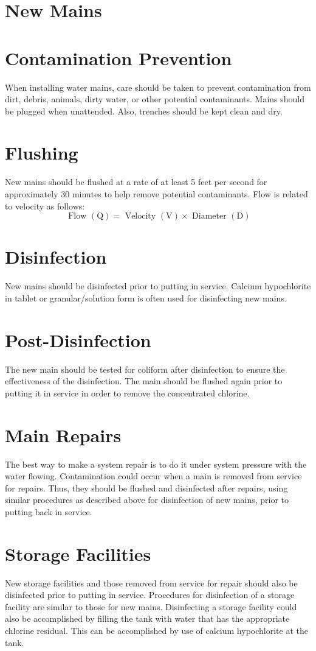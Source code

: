 \documentclass[10pt]{article}
\begin{document}
\section{New Mains}
\section{Contamination Prevention}
When installing water mains, care should be taken to prevent contamination from dirt, debris, animals, dirty water, or other potential contaminants. Mains should be plugged when unattended. Also, trenches should be kept clean and dry.

\section{Flushing}
New mains should be flushed at a rate of at least 5 feet per second for approximately 30 minutes to help remove potential contaminants. Flow is related to velocity as follows:
$$
\text { Flow }(\mathrm{Q})=\text { Velocity }(\mathrm{V}) \times \text { Diameter }(\mathrm{D})
$$

\section{Disinfection}
New mains should be disinfected prior to putting in service. Calcium hypochlorite in tablet or granular/solution form is often used for disinfecting new mains.

\section{Post-Disinfection}
The new main should be tested for coliform after disinfection to ensure the effectiveness of the disinfection. The main should be flushed again prior to putting it in service in order to remove the concentrated chlorine.

\section{Main Repairs}
The best way to make a system repair is to do it under system pressure with the water flowing. Contamination could occur when a main is removed from service for repairs. Thus, they should be flushed and disinfected after repairs, using similar procedures as described above for disinfection of new mains, prior to putting back in service.

\section{Storage Facilities}
New storage facilities and those removed from service for repair should also be disinfected prior to putting in service. Procedures for disinfection of a storage facility are similar to those for new mains. Disinfecting a storage facility could also be accomplished by filling the tank with water that has the appropriate chlorine residual. This can be accomplished by use of calcium hypochlorite at the tank.
\end{document}
